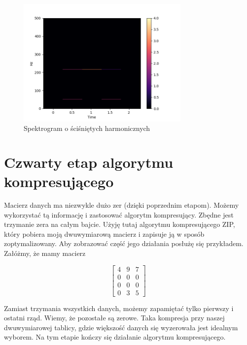 \documentclass[a4paper,12pt]{extarticle}
\begin{document}
\begin{figure}[h!]
\centering
\includegraphics[width=0.75\textwidth]{spec-squeezed}
\caption{Spektrogram o ściśniętych harmonicznych}
\end{figure}

\clearpage

\section*{Czwarty etap algorytmu kompresującego}

Macierz danych ma niezwykle dużo zer (dzięki poprzednim etapom). Możemy wykorzystać tą informację i zastosować algorytm kompresujący. Zbędne jest trzymanie zera na całym bajcie. Użyję tutaj algorytmu kompresującego ZIP, który pobiera moją dwuwymiarową macierz i zapisuje ją w sposób zoptymalizowany. Aby zobrazować część jego działania posłużę się przykładem. Załóżmy, że mamy macierz

$$
\begin{bmatrix}
4 & 9 & 7\\
0 & 0 & 0\\
0 & 0 & 0\\
0 & 3 & 5
\end{bmatrix}
$$

\noindent Zamiast trzymania wszystkich danych, możemy zapamiętać tylko pierwszy i ostatni rząd. Wiemy, że pozostałe są zerowe. Taka kompresja przy naszej dwuwymiarowej tablicy, gdzie większość danych się wyzerowała jest idealnym wyborem. Na tym etapie kończy się działanie algorytmu kompresującego.
\end{document}
